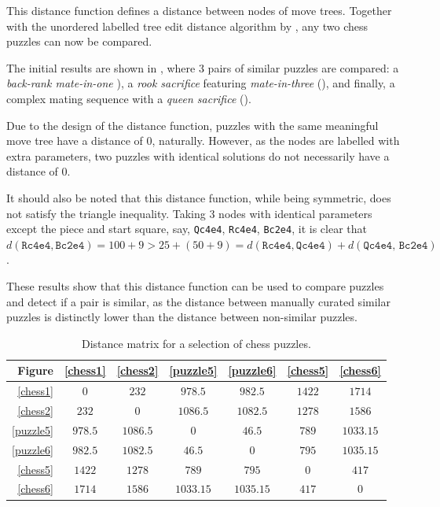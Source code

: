 This distance function defines a distance between nodes of move trees. Together
with the unordered labelled tree edit distance algorithm by \citet{editDistTrees},
any two chess puzzles can now be compared. 

The initial results are shown in , where 3 pairs of
similar puzzles are compared: a \emph{back-rank mate-in-one}
), a \emph{rook sacrifice} featuring \emph{mate-in-three}
(), and finally, a complex mating sequence with a
\emph{queen sacrifice} (). 

Due to the design of the distance function, puzzles with the same meaningful
move tree have a distance of 0, naturally. However, as the nodes are labelled
with extra parameters, two puzzles with identical solutions do not necessarily
have a distance of 0.

It should also be noted that this distance function, while being symmetric,
does not satisfy the triangle inequality. Taking 3 nodes with identical
parameters except the piece and start square, say, \texttt{Qc4e4},
\texttt{Rc4e4}, \texttt{Bc2e4}, it is clear that $d(\texttt{Rc4e4},
\texttt{Bc2e4}) = 100 + 9 > 25 + (50 + 9) = d(\texttt{Rc4e4}, \texttt{Qc4e4}) +
d(\texttt{Qc4e4, Bc2e4})$.

These results show that this distance function can be used to compare puzzles
and detect if a pair is similar, as the distance between manually curated
similar puzzles is distinctly lower than the distance between non-similar
puzzles.

\begin{table}[H]
  \centering
  \begin{tabular}{r|cccccc}
    Figure &
    \ref{chess1}&\ref{chess2}&\ref{puzzle5}&\ref{puzzle6}&\ref{chess5}&\ref{chess6}
    \\
    \hline
    \ref{chess1} & $0$ & $232$ & $978.5$ & $982.5$ & $1422$ & $1714$ \\ 
    \ref{chess2} & $232$ & $0$ & $1086.5$ & $1082.5$ & $1278$ & $1586$ \\
    \ref{puzzle5} & $978.5$ & $1086.5$ & $0$ & $46.5$ & $789$ & $1033.15$ \\
    \ref{puzzle6} & $982.5$ & $1082.5$ & $46.5$ & $0$ & $795$ & $1035.15$ \\
    \ref{chess5} & $1422$ & $1278$ & $789$ & $795$ & $0$ & $417$ \\
    \ref{chess6} & $1714$ & $1586$ & $1033.15$ & $1035.15$ & $417$ & $0$ \\
  \end{tabular}
  \caption{Distance matrix for a selection of chess puzzles.}
  \label{distanceComparisons}
\end{table}

